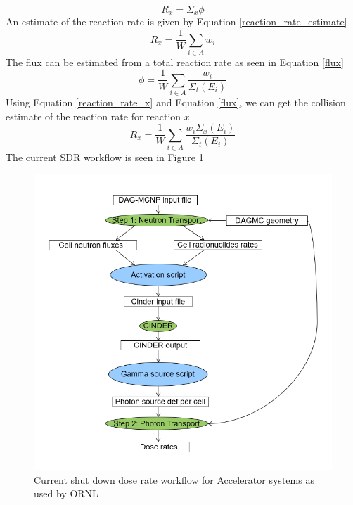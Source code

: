\begin{equation}\label{reaction_rate_x}
  R_{x} = \Sigma_{x} \phi
\end{equation}
An estimate of the reaction rate is given by Equation \ref{reaction_rate_estimate}
\begin{equation}\label{reaction_rate_estimate}
  R_{x} = \frac{1}{W} \sum_{i \in A} w_{i}
\end{equation}
The flux can be estimated from a total reaction rate as seen in Equation
\ref{flux}
\begin{equation}\label{flux}
  \phi = \frac{1}{W} \sum_{i \in A} \frac{w_{i}}{\Sigma_{t}(E_{i})}
\end{equation}
Using Equation \ref{reaction_rate_x} and Equation \ref{flux}, we can get
the collision estimate of the reaction rate for reaction $x$
\begin{equation}\label{reaction_x_estimate}
  R_{x} = \frac{1}{W} \sum_{i \in A} \frac{w_{i} \Sigma_{x}(E_{i})}{\Sigma_{t}(E_{i})}
\end{equation}
The current SDR workflow is seen in Figure \ref{rnucs_r2s}
\begin{figure}[h!]
\begin{centering}
\includegraphics[scale=0.4]{../figs/rnucs_r2s.png}
\caption{Current shut down dose rate workflow for Accelerator systems as used by ORNL}
\label{rnucs_r2s}
\end{centering}
\end{figure}
\newpage
